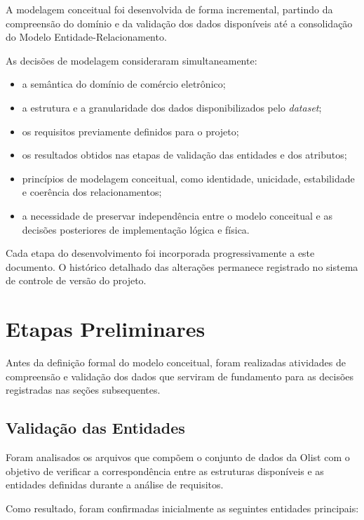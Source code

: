 \documentclass[12pt,a4paper]{article}
\begin{document}
	A modelagem conceitual foi desenvolvida de forma incremental, partindo da
	compreensão do domínio e da validação dos dados disponíveis até a consolidação
	do Modelo Entidade-Relacionamento.
	
	As decisões de modelagem consideraram simultaneamente:
	
	\begin{itemize}[leftmargin=1.2cm]
		\item a semântica do domínio de comércio eletrônico;
		\item a estrutura e a granularidade dos dados disponibilizados pelo \textit{dataset};
		\item os requisitos previamente definidos para o projeto;
		\item os resultados obtidos nas etapas de validação das entidades e dos atributos;
		\item princípios de modelagem conceitual, como identidade, unicidade, estabilidade e coerência dos relacionamentos;
		\item a necessidade de preservar independência entre o modelo conceitual e as decisões posteriores de implementação lógica e física.
	\end{itemize}
	
	Cada etapa do desenvolvimento foi incorporada progressivamente a este
	documento. O histórico detalhado das alterações permanece registrado no
	sistema de controle de versão do projeto.
	
	\section{Etapas Preliminares}
	
	Antes da definição formal do modelo conceitual, foram realizadas atividades de
	compreensão e validação dos dados que serviram de fundamento para as decisões
	registradas nas seções subsequentes.
	
	\subsection{Validação das Entidades}
	
	Foram analisados os arquivos que compõem o conjunto de dados da Olist com o
	objetivo de verificar a correspondência entre as estruturas disponíveis e as
	entidades definidas durante a análise de requisitos.
	
	Como resultado, foram confirmadas inicialmente as seguintes entidades
	principais:
	
\end{document}
